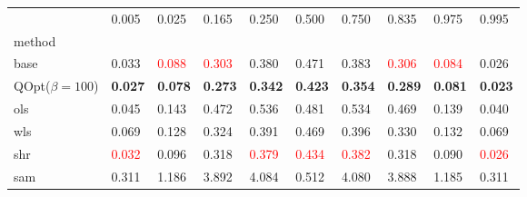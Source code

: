 \begin{tabular}{llllllllll}
\toprule
 & 0.005 & 0.025 & 0.165 & 0.250 & 0.500 & 0.750 & 0.835 & 0.975 & 0.995 \\
method &  &  &  &  &  &  &  &  &  \\
\midrule
base & 0.033 & \textcolor{red}{0.088} & \textcolor{red}{0.303} & 0.380 & 0.471 & 0.383 & \textcolor{red}{0.306} & \textcolor{red}{0.084} & 0.026 \\
\midrule
QOpt($\beta=100$) & \textbf{0.027} & \textbf{0.078} & \textbf{0.273} & \textbf{0.342} & \textbf{0.423} & \textbf{0.354} & \textbf{0.289} & \textbf{0.081} & \textbf{0.023} \\
ols & 0.045 & 0.143 & 0.472 & 0.536 & 0.481 & 0.534 & 0.469 & 0.139 & 0.040 \\
wls & 0.069 & 0.128 & 0.324 & 0.391 & 0.469 & 0.396 & 0.330 & 0.132 & 0.069 \\
shr & \textcolor{red}{0.032} & 0.096 & 0.318 & \textcolor{red}{0.379} & \textcolor{red}{0.434} & \textcolor{red}{0.382} & 0.318 & 0.090 & \textcolor{red}{0.026} \\
sam & 0.311 & 1.186 & 3.892 & 4.084 & 0.512 & 4.080 & 3.888 & 1.185 & 0.311 \\
\bottomrule
\end{tabular}